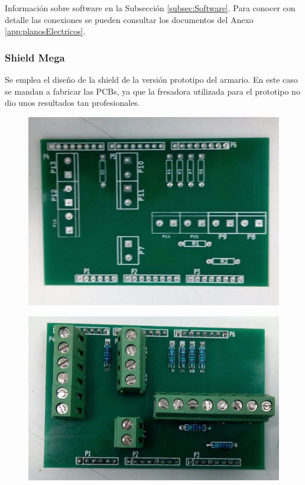 Información sobre software en la Subsección \ref{subsec:Software}. Para conocer con detalle las conexiones se pueden consultar los documentos del Anexo \ref{app:planosElectricos}.

\subsubsection{Shield Mega}
Se emplea el diseño de la shield de la versión prototipo del armario. En este caso se mandan a fabricar las PCBs, ya que la fresadora utilizada para el prototipo no dio unos resultados tan profesionales.

\begin{figure}
\centering
\begin{minipage}{.5\textwidth}
  \centering
  \includegraphics[width=.9\textwidth]{Figures/pcbMega}
  \label{fig:pcbdMega}
\end{minipage}%
\begin{minipage}{.5\textwidth}
  \centering
  \includegraphics[width=.9\textwidth]{Figures/shieldMega}
  \label{fig:shieldMega}
\end{minipage}
\end{figure}


